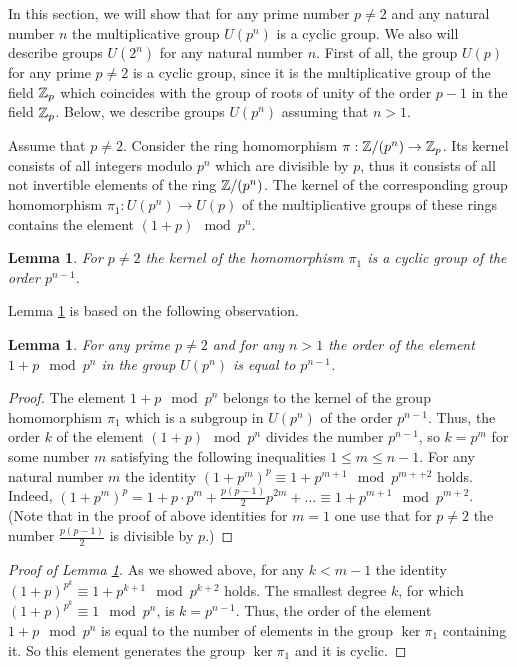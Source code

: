 \documentclass[11pt]{article}
\theoremstyle{plain}
\newtheorem{lemma}[theorem]{Lemma}
\theoremstyle{definition}
\begin{document}
In this section, we will show that for any prime number $p\neq 2$ and any natural number $n$ the multiplicative group $U(p^n)$ is a cyclic group. We also  will describe groups $U(2^n)$ for any natural number  $n$. First of all, the group $U(p)$ for any prime $p\neq 2$  is a cyclic group,  since it is the multiplicative group of the field $\Bbb Z_p$ which coincides with the group of roots of unity of the order $p-1$ in the field $\Bbb  Z_p$. Below, we describe  groups $U(p^n)$ assuming that $n>1$.

Assume that $p\neq 2$. Consider the ring homomorphism $\pi: \Bbb Z/(p^n)\to \Bbb Z_p$. Its kernel consists of all integers modulo  $p^n$ which are divisible by $p$, thus it consists of all not invertible elements of the ring $\Bbb Z/(p^n)$.    The kernel of the corresponding group  homomorphism  $\pi_1:U(p^n)\to U(p)$ of the multiplicative groups of these rings contains the element $(1+p) \mod p^n$.

\begin{lemma}\label{kernel}  For $p\neq 2$ the kernel of the homomorphism $\pi_1$ is a cyclic group of the order $p^{n-1}$.
\end{lemma}

Lemma \ref{kernel}  is based on the following observation.

\begin{lemma}\label{divisibility} For any prime $p\neq 2$ and for any $n>1$ the order  of the element $1+p \mod p^n$ in the group $U(p^n)$ is equal to $p^{n-1}$.
\end{lemma}

\begin{proof} The element $1+p \mod p^n$ belongs to the kernel of the group homomorphism $\pi_1$ which is  a subgroup in $U(p^n)$ of the order $p^{n-1}$. Thus, the order  $k$ of the element $(1+p) \mod p^n$ divides the number $p^{n-1}$, so $k=p^m$ for some number $m$ satisfying the following  inequalities $1\leq m\leq n-1$.
For any natural number $m$ the identity $(1+p^m)^p \equiv  1 + p^{m+1}  \mod p^{m++2}$ holds. Indeed, $(1+p^m)^p= 1+ p \cdot p^m  + \frac {p(p-1)}{2}p^{2m} +\dots \equiv 1+p^{m+1} \mod p^{m+2}$.
(Note  that  in the proof of above  identities  for $m=1$  one
use that for $p\neq 2$ the number $\frac {p(p-1)}{2}$ is divisible by $p$.)
\end{proof}

\begin{proof}[Proof of Lemma \ref{kernel}]  As we showed above, for any $k<m-1$ the identity $(1+p)^{p^k}\equiv 1+ p^{k+1} \mod p^{k+2}$ holds.  The smallest degree $k$, for which $(1+p)^{p^k}\equiv 1\mod p^n$,  is $k=p^{n-1}$. Thus, the order  of the element $1+p\mod p^n$ is equal to the number of elements in the group $\ker \pi_1$ containing it. So this element generates the group $\ker \pi_1$ and it is cyclic.
\end{proof}
\end{document}

